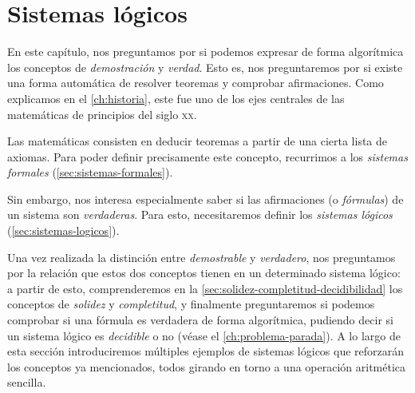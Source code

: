

\chapter{Sistemas lógicos}\label{ch:sistemas-logicos}

En este capítulo, nos preguntamos por si podemos expresar de forma algorítmica los conceptos de \emph{demostración} y \emph{verdad}. Esto es, nos preguntaremos por si existe una forma automática de resolver teoremas y comprobar afirmaciones. Como explicamos en el \cref{ch:historia}, este fue uno de los ejes centrales de las matemáticas de principios del siglo \textsc{xx}.

Las matemáticas consisten en deducir teoremas a partir de una cierta lista de axiomas. Para poder definir precisamente este concepto, recurrimos a los \emph{sistemas formales} (\cref{sec:sistemas-formales}).

Sin embargo, nos interesa especialmente saber si las afirmaciones (o \emph{fórmulas}) de un sistema son \emph{verdaderas}. Para esto, necesitaremos definir los \emph{sistemas lógicos} (\cref{sec:sistemas-logicos}).

Una vez realizada la distinción entre \emph{demostrable} y \emph{verdadero}, nos preguntamos por la relación que estos dos conceptos tienen en un determinado sistema lógico: a partir de esto, comprenderemos en la \cref{sec:solidez-completitud-decidibilidad} los conceptos de \emph{solidez} y \emph{completitud}, y finalmente preguntaremos si podemos comprobar si una fórmula es verdadera de forma algorítmica, pudiendo decir si un sistema lógico es \emph{decidible} o no (véase el \cref{ch:problema-parada}). A lo largo de esta sección introduciremos múltiples ejemplos de sistemas lógicos que reforzarán los conceptos ya mencionados, todos girando en torno a una operación aritmética sencilla.

